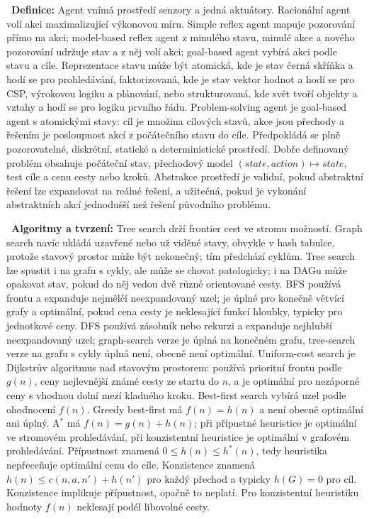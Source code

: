 \begin{odpoved}
\setlength{\parskip}{2pt}
\noindent{}\ \textbf{Definice:} Agent vnímá prostředí senzory a jedná aktuátory. Racionální agent volí akci maximalizující výkonovou míru. Simple reflex agent mapuje pozorování přímo na akci; model-based reflex agent z minulého stavu, minulé akce a nového pozorování udržuje stav a z něj volí akci; goal-based agent vybírá akci podle stavu a cíle. Reprezentace stavu může být atomická, kde je stav černá skříňka a hodí se pro prohledávání, faktorizovaná, kde je stav vektor hodnot a hodí se pro CSP, výrokovou logiku a plánování, nebo strukturovaná, kde svět tvoří objekty a vztahy a hodí se pro logiku prvního řádu. Problem-solving agent je goal-based agent s atomickými stavy: cíl je množina cílových stavů, akce jsou přechody a řešením je posloupnost akcí z počátečního stavu do cíle. Předpokládá se plně pozorovatelné, diskrétní, statické a deterministické prostředí. Dobře definovaný problém obsahuje počáteční stav, přechodový model $(state,action)\mapsto state$, test cíle a cenu cesty nebo kroků. Abstrakce prostředí je validní, pokud abstraktní řešení lze expandovat na reálné řešení, a užitečná, pokud je vykonání abstraktních akcí jednodušší než řešení původního problému.\par
\noindent{}\ \textbf{Algoritmy a tvrzení:} Tree search drží frontier cest ve stromu možností. Graph search navíc ukládá uzavřené nebo už viděné stavy, obvykle v hash tabulce, protože stavový prostor může být nekonečný; tím předchází cyklům. Tree search lze spustit i na grafu s cykly, ale může se chovat patologicky; i na DAGu může opakovat stav, pokud do něj vedou dvě různé orientované cesty. BFS používá frontu a expanduje nejmělčí neexpandovaný uzel; je úplné pro konečně větvící grafy a optimální, pokud cena cesty je neklesající funkcí hloubky, typicky pro jednotkové ceny. DFS používá zásobník nebo rekurzi a expanduje nejhlubší neexpandovaný uzel; graph-search verze je úplná na konečném grafu, tree-search verze na grafu s cykly úplná není, obecně není optimální. Uniform-cost search je Dijkstrův algoritmus nad stavovým prostorem: používá prioritní frontu podle $g(n)$, ceny nejlevnější známé cesty ze startu do $n$, a je optimální pro nezáporné ceny s vhodnou dolní mezí kladného kroku. Best-first search vybírá uzel podle ohodnocení $f(n)$. Greedy best-first má $f(n)=h(n)$ a není obecně optimální ani úplný. A$^*$ má $f(n)=g(n)+h(n)$; při přípustné heuristice je optimální ve stromovém prohledávání, při konzistentní heuristice je optimální v grafovém prohledávání. Přípustnost znamená $0\le h(n)\le h^*(n)$, tedy heuristika nepřeceňuje optimální cenu do cíle. Konzistence znamená $h(n)\le c(n,a,n')+h(n')$ pro každý přechod a typicky $h(G)=0$ pro cíl. Konzistence implikuje přípustnost, opačně to neplatí. Pro konzistentní heuristiku hodnoty $f(n)$ neklesají podél libovolné cesty.\par

\end{odpoved}
